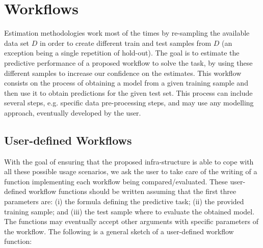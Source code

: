 \documentclass[10pt,a4paper]{article}\usepackage[]{graphicx}\usepackage[]{color}
\begin{document}
\section{Workflows}

Estimation methodologies work most of the times by re-sampling the
available data set $D$ in order to create different train and test
samples from $D$ (an exception being a single repetition of hold-out). The goal is to estimate the predictive performance
of a proposed workflow to solve the task, by using these different
samples to increase our confidence on the estimates. This workflow
consists on the process of obtaining a model from a given training
sample and then use it to obtain predictions for the given test
set. This process can include several steps, e.g. specific data
pre-processing steps, and may use any modelling approach, eventually
developed  by the user. 

\subsection{User-defined Workflows}

With the goal of ensuring that the
proposed infra-structure is able to cope with all these possible usage
scenarios, we ask the user to take care of the writing of a function
implementing each workflow being compared/evaluated. These
user-defined workflow functions should be written assuming that the
first three parameters are: (i) the formula defining the predictive
task; (ii) the provided training sample; and (iii) the test sample
where to evaluate the obtained model. The functions may eventually
accept other arguments with specific parameters of the workflow. The
following is a general sketch of a user-defined workflow function:
\end{document}
